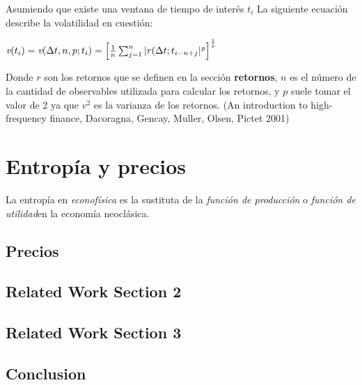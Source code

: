 Asumiendo que existe una ventana de tiempo de interés  $t_{i}$ La siguiente ecuación describe la volatilidad en cuestión:

\begin{center}

$\textit{v}(t_{i}) = \textit{v}(\Delta t, n, p; t_{i}) = \Bigl[ \frac{1}{n} \sum_{j = 1}^{n} |r (\Delta t ; t_{i-n+j}|^{\textit{p}} \Bigr]^\frac{1}{\textit{p}}$

\end{center}

Donde $\textit{r}$ son los retornos que se definen en la sección \textbf{retornos}, $\textit{n}$ es el número de la cantidad de observables utilizada para calcular los retornos, y $\textit{p}$ suele tomar el valor de 2 ya que $\textit{v}^{2}$ es la varianza de los retornos.  (An introduction to high-frequency finance, Dacoragna, Gencay, Muller, Olsen, Pictet 2001)



%
%
%
%
%
\chapter{Entropía y precios}
\label{sec:related}


La entropía en \textit{econofísica} es la sustituta de la \textit{función de producción} o \textit{función de utilidad}en la economía neoclásica. 

\section{ Precios }
\label{sec:precios}

\Blindtext[2][2]

\section{Related Work Section 2}
\label{sec:related:sec2}

\Blindtext[3][2]

\section{Related Work Section 3}
\label{sec:related:sec3}

\Blindtext[4][2]

\section{Conclusion}
\label{sec:related:conclusion}

\Blindtext[2][1]

